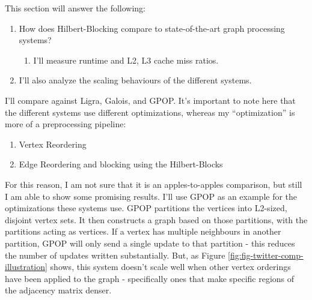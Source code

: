     This section will answer the following:
    \begin{enumerate}
        \item How does Hilbert-Blocking compare to state-of-the-art graph processing systems? 
        \begin{enumerate}
            \item I'll measure runtime and L2, L3 cache miss ratios.
            
        \end{enumerate}
        \item I'll also analyze the scaling behaviours of the different systems.
    \end{enumerate}
    I'll compare against Ligra, Galois, and GPOP.
    It's important to note here that the different systems use different optimizations, whereas my ``optimization'' is more of a preprocessing pipeline: 
    \begin{enumerate}
        \item Vertex Reordering
        \item Edge Reordering and blocking using the Hilbert-Blocks
    \end{enumerate}
    For this reason, I am not sure that it is an apples-to-apples comparison, but still I am able to show some promising results. \newline
    I'll use GPOP as an example for the optimizations these systems use. GPOP partitions the vertices into L2-sized, disjoint vertex sets. It then constructs a graph based on those partitions, with the partitions acting as vertices. If a vertex has multiple neighbours in another partition, GPOP will only send a single update to that partition - this reduces the number of updates written substantially. \newline
    But, as Figure \ref{fig:fig-twitter-comp-illustration} shows, this system doesn't scale well when other vertex orderings have been applied to the graph - specifically ones that make specific regions of the adjacency matrix denser.


